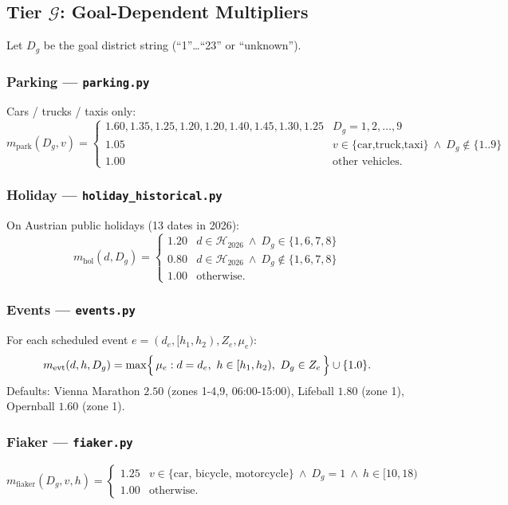 \documentclass[12pt,a4paper]{article}
\begin{document}
\subsection{Tier $\mathcal{G}$: Goal-Dependent Multipliers}

Let $D_g$ be the goal district string (``1''…``23'' or ``unknown'').

\subsubsection{Parking — \texttt{parking.py}}
Cars / trucks / taxis only:
\[
m_{\text{park}}(D_g,v) =
\begin{cases}
1.60,1.35,1.25,1.20,1.20,1.40,1.45,1.30,1.25 & D_g=1,2,\ldots,9 \\
1.05 & v\in\{\text{car,truck,taxi}\}\ \land\ D_g \notin \{1..9\} \\
1.00 & \text{other vehicles.}
\end{cases}
\]

\subsubsection{Holiday — \texttt{holiday\_historical.py}}
On Austrian public holidays (13 dates in 2026):
\[
m_{\text{hol}}(d, D_g) =
\begin{cases}
1.20 & d\in\mathcal{H}_{2026}\ \land\ D_g\in\{1,6,7,8\} \\
0.80 & d\in\mathcal{H}_{2026}\ \land\ D_g\notin\{1,6,7,8\} \\
1.00 & \text{otherwise.}
\end{cases}
\]

\subsubsection{Events — \texttt{events.py}}
For each scheduled event $e=(d_e, [h_1,h_2), Z_e, \mu_e)$:
\[
m_{\text{evt}}(d,h,D_g) = \max\Bigl\{\,\mu_e : d=d_e,\ h\in[h_1,h_2),\ D_g\in Z_e\,\Bigr\} \cup \{1.0\}.
\]
Defaults: Vienna Marathon $2.50$ (zones 1-4,9, 06:00-15:00), Lifeball $1.80$ (zone 1), Opernball $1.60$ (zone 1).

\subsubsection{Fiaker — \texttt{fiaker.py}}
\[
m_{\text{fiaker}}(D_g,v,h) =
\begin{cases}
1.25 & v\in\{\text{car, bicycle, motorcycle}\}\ \land\ D_g=1\ \land\ h\in[10,18) \\
1.00 & \text{otherwise.}
\end{cases}
\]
\end{document}
